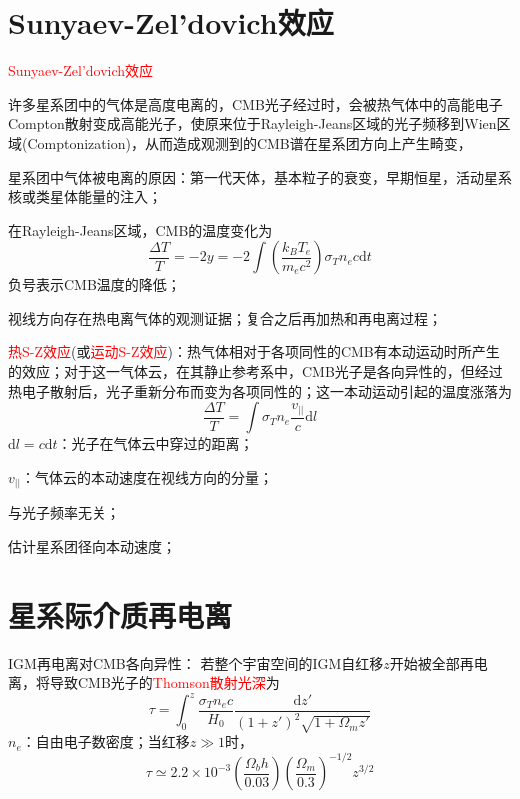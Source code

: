 \documentclass[12pt,a4paper]{article}
\newcommand{\dif}{\mathrm{d}}
\begin{document}
\section{Sunyaev-Zel'dovich效应}

\textcolor{red}{Sunyaev-Zel'dovich效应}

许多星系团中的气体是高度电离的，CMB光子经过时，会被热气体中的高能电子Compton散射变成高能光子，使原来位于Rayleigh-Jeans区域的光子频移到Wien区域(Comptonization)，从而造成观测到的CMB谱在星系团方向上产生畸变，

星系团中气体被电离的原因：第一代天体，基本粒子的衰变，早期恒星，活动星系核或类星体能量的注入；

在Rayleigh-Jeans区域，CMB的温度变化为
\begin{equation}
\frac{\Delta T}{T} =  -2y = -2 \int \left(\frac{k_B T_e}{m_e c^2} \right) \sigma_T n_e c \dif t
\end{equation}
负号表示CMB温度的降低；

视线方向存在热电离气体的观测证据；复合之后再加热和再电离过程；

\textcolor{red}{热S-Z效应}(或\textcolor{red}{运动S-Z效应})：热气体相对于各项同性的CMB有本动运动时所产生的效应；对于这一气体云，在其静止参考系中，CMB光子是各向异性的，但经过热电子散射后，光子重新分布而变为各项同性的；这一本动运动引起的温度涨落为
\begin{equation}
\frac{\Delta T}{T} =  \int \sigma_T n_e \frac{v_{||}}{c} \dif l
\end{equation}
$\dif l =c \dif t$：光子在气体云中穿过的距离；

$v_{||}$：气体云的本动速度在视线方向的分量；

与光子频率无关；


估计星系团径向本动速度；

\section{星系际介质再电离}

IGM再电离对CMB各向异性：
若整个宇宙空间的IGM自红移$z$开始被全部再电离，将导致CMB光子的\textcolor{red}{Thomson散射光深}为
\begin{equation}
\tau = \int_0^{z} \frac{\sigma_T n_e c}{H_0} \frac{\dif z'}{(1+z')^2 \sqrt{1+\Omega_m z'}}
\end{equation}
$n_e$：自由电子数密度；当红移$z \gg 1$时，
\begin{equation}
\tau \simeq 2.2 \times 10^{-3} \left( \frac{\Omega_b h}{0.03} \right) \left(\frac{\Omega_m}{0.3} \right)^{-1/2} z^{3/2}
\end{equation}
\end{document}
